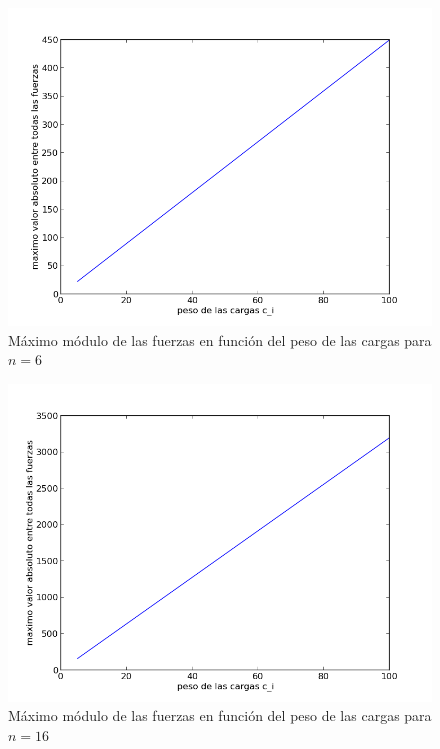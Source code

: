 \begin{figure}[!h]
	\begin{center}
		  \includegraphics[scale=0.4]{Imagenes/variable_cis/equal_cis/equal_cis_n_6}
		  \caption{Máximo módulo de las fuerzas en función del peso de las cargas para $n=6$}
		  \label{fig:contra1}
	\end{center}
\end{figure}
\FloatBarrier

\begin{figure}[!h]
	\begin{center}
		  \includegraphics[scale=0.4]{Imagenes/variable_cis/equal_cis/equal_cis_n_16}
		  \caption{Máximo módulo de las fuerzas en función del peso de las cargas para $n=16$}
		  \label{fig:contra1}
	\end{center}
\end{figure}
\FloatBarrier


